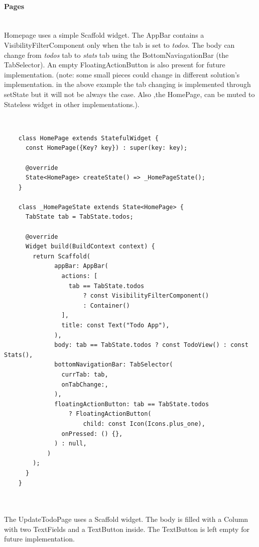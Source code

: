 	\mbox{}
	
	
	\paragraph{Pages} \mbox{} \\
	\label{par:todo_app_pages}
Homepage uses a simple Scaffold widget. The AppBar contains a VisibilityFilterComponent only when the tab is set to \textit{todos}. The body can change from \textit{todos} tab to \textit{stats} tab using the BottomNaviagationBar (the TabSelector). An empty FloatingActionButton is also present for future implementation.
	(note: some small pieces could change in different solution’s implementation. in the above example the tab changing is implemented through setState but it will not be always the case. Also ,the HomePage, can be muted to Stateless widget in other implementations.).
	
	\mbox{}\\
	
	 \mbox{}
	\begin{verbatim}
	class HomePage extends StatefulWidget {
	  const HomePage({Key? key}) : super(key: key);
	
	  @override
	  State<HomePage> createState() => _HomePageState();
	}
	
	class _HomePageState extends State<HomePage> {
	  TabState tab = TabState.todos; 
	
	  @override
	  Widget build(BuildContext context) {
	    return Scaffold(
	          appBar: AppBar(
	            actions: [
	              tab == TabState.todos
	                  ? const VisibilityFilterComponent()
	                  : Container()
	            ],
	            title: const Text("Todo App"),
	          ),
	          body: tab == TabState.todos ? const TodoView() : const Stats(),
	          bottomNavigationBar: TabSelector(
	            currTab: tab,
	            onTabChange:,
	          ),
	          floatingActionButton: tab == TabState.todos
	              ? FloatingActionButton(
	                  child: const Icon(Icons.plus_one),
	            onPressed: () {},
	          ) : null,
	        )
	    );
	  }
	}
	
	
	\end{verbatim}
	
	\mbox{}
	
	
	The UpdateTodoPage uses a Scaffold widget. The body is filled with a Column with two TextFields and a TextButton inside. The TextButton is left empty for future implementation.
	
